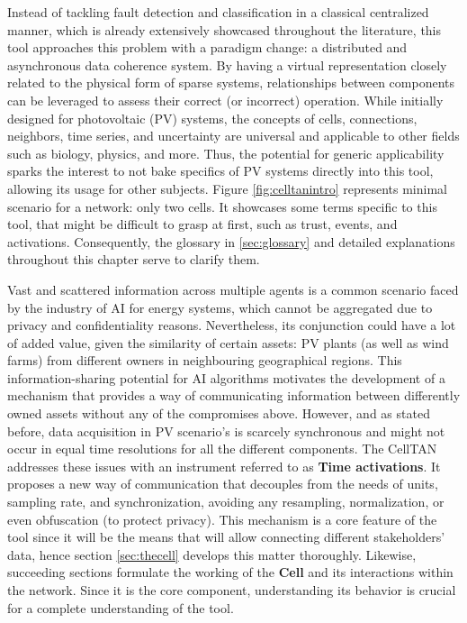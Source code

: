 Instead of tackling fault detection and classification in a classical centralized manner, which is already extensively showcased throughout the literature, this tool approaches this problem with a paradigm change: a distributed and asynchronous data coherence system. By having a virtual representation closely related to the physical form of sparse systems, relationships between components can be leveraged to assess their correct (or incorrect) operation. While initially designed for photovoltaic (PV) systems, the concepts of cells, connections, neighbors, time series, and uncertainty are universal and applicable to other fields such as biology, physics, and more. Thus, the potential for generic applicability sparks the interest to not bake specifics of PV systems directly into this tool, allowing its usage for other subjects. Figure \ref{fig:celltanintro} represents minimal scenario for a network: only two cells. It showcases some terms specific to this tool, that might be difficult to grasp at first, such as trust, events, and activations. Consequently, the glossary in \ref{sec:glossary} and detailed explanations throughout this chapter serve to clarify them.

Vast and scattered information across multiple agents is a common scenario faced by the industry of AI for energy systems, which cannot be aggregated due to privacy and confidentiality reasons. Nevertheless, its conjunction could have a lot of added value, given the similarity of certain assets: PV plants (as well as wind farms) from different owners in neighbouring geographical regions. This information-sharing potential for AI algorithms motivates the development of a mechanism that provides a way of communicating information between differently owned assets without any of the compromises above. However, and as stated before, data acquisition in PV scenario's is scarcely synchronous and might not occur in equal time resolutions for all the different components. The CellTAN addresses these issues with an instrument referred to as \textbf{Time activations}. It proposes a new way of communication that decouples from the needs of units, sampling rate, and synchronization, avoiding any resampling, normalization, or even obfuscation (to protect privacy). This mechanism is a core feature of the tool since it will be the means that will allow connecting different stakeholders' data, hence section \ref{sec:thecell} develops this matter thoroughly. Likewise, succeeding sections formulate the working of the \textbf{Cell} and its interactions within the network. Since it is the core component, understanding its behavior is crucial for a complete understanding of the tool.

